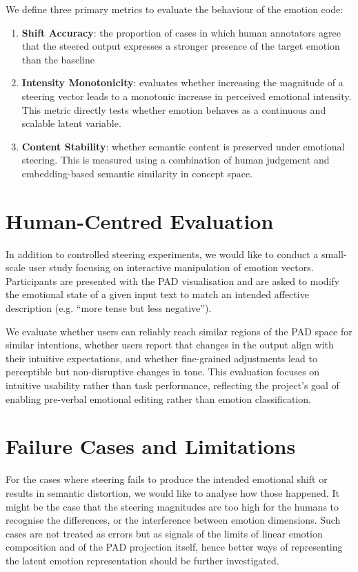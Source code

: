 \documentclass[12pt,twoside]{report}
\begin{document}
We define three primary metrics to evaluate the behaviour of the emotion code:
\begin{enumerate}
    \item \textbf{Shift Accuracy}: the proportion of cases in which human annotators agree that the steered output expresses a stronger presence of the target emotion than the baseline
    \item \textbf{Intensity Monotonicity}: evaluates whether increasing the magnitude of a steering vector leads to a monotonic increase in perceived emotional intensity. This metric directly tests whether emotion behaves as a continuous and scalable latent variable.
    \item \textbf{Content Stability}: whether semantic content is preserved under emotional steering. This is measured using a combination of human judgement and embedding-based semantic similarity in concept space.
\end{enumerate}

\section{Human-Centred Evaluation}

In addition to controlled steering experiments, we would like to conduct a small-scale user study focusing on interactive manipulation of emotion vectors. Participants are presented with the PAD visualisation and are asked to modify the emotional state of a given input text to match an intended affective description (e.g. ``more tense but less negative'').

We evaluate whether users can reliably reach similar regions of the PAD space for similar intentions, whether users report that changes in the output align with their intuitive expectations, and whether fine-grained adjustments lead to perceptible but non-disruptive changes in tone. This evaluation focuses on intuitive usability rather than task performance, reflecting the project’s goal of enabling pre-verbal emotional editing rather than emotion classification.

\section{Failure Cases and Limitations}

For the cases where steering fails to produce the intended emotional shift or results in semantic distortion, we would like to analyse how those happened. It might be the case that the steering magnitudes are too high for the humans to recognise the differences, or the interference between emotion dimensions. Such cases are not treated as errors but as signals of the limits of linear emotion composition and of the PAD projection itself, hence better ways of representing the latent emotion representation should be further investigated.
\end{document}
